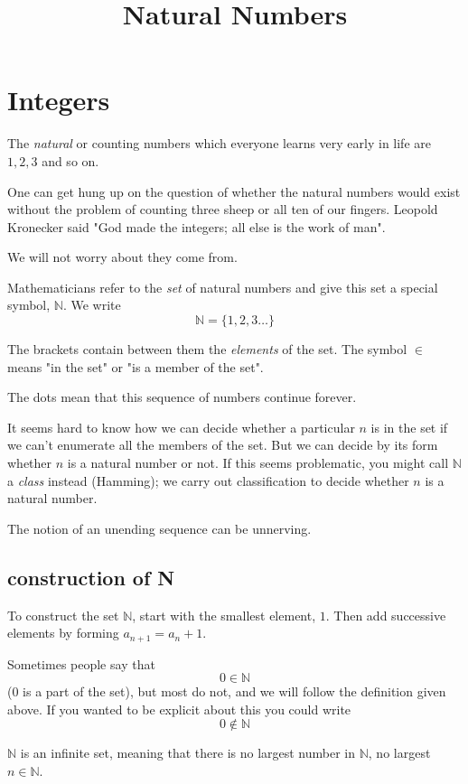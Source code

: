 \documentclass[11pt, oneside]{article}
\title{Natural Numbers}
\date{}
\begin{document}
\maketitle
\Large
\section*{Integers}

The \emph{natural} or counting numbers which everyone learns very early in life are $1, 2, 3$ and so on.

One can get hung up on the question of whether the natural numbers would exist without the problem of counting three sheep or all ten of our fingers.  Leopold Kronecker said "God made the integers; all else is the work of man".

We will not worry about they come from.

Mathematicians refer to the \emph{set} of natural numbers and give this set a special symbol, $\mathbb{N}$.  We write
\[ \mathbb{N} = \{ 1, 2, 3 \dots \} \]

The brackets contain between them the \emph{elements} of the set.  The symbol $\in$ means "in the set" or "is a member of the set".

The dots mean that this sequence of numbers continue forever.

It seems hard to know how we can decide whether a particular $n$ is in the set if we can't enumerate all the members of the set.  But we can decide by its form whether $n$ is a natural number or not.  If this seems problematic, you might call $\mathbb{N}$ a \emph{class} instead (Hamming);  we carry out classification to decide whether $n$ is a natural number.

The notion of an unending sequence can be unnerving.  

\subsection*{construction of N}

To construct the set $\mathbb{N}$, start with the smallest element, $1$.  Then add successive elements by forming $a_{n+1} = a_n + 1$.

Sometimes people say that
\[ 0 \in \mathbb{N} \]
(0 is a part of the set), but most do not, and we will follow the definition given above.  If you wanted to be explicit about this you could write
\[ 0 \notin \mathbb{N} \]

$\mathbb{N}$ is an infinite set, meaning that there is no largest number in $\mathbb{N}$, no largest $n \in \mathbb{N}$.
\end{document}
